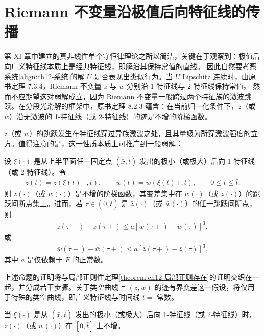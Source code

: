 \documentclass[../../main.tex]{subfiles}
\begin{document}
\section{Riemann 不变量沿极值后向特征线的传播}\label{section:ch12-传播}

第 XI 章中建立的真非线性单个守恒律理论之所以简洁，关键在于观察到：极值后向广义特征线本质上是经典特征线，即解沿其保持常值的直线。
因此自然要考察系统\eqref{align:ch12-系统}的解 $U$ 是否表现出类似行为。当 $U$ Lipschitz 连续时，由原书定理 7.3.4，Riemann 不变量 $z$ 与 $w$ 分别沿 1-特征线与 2-特征线保持常值。
然而不应期望这对弱解成立，因为 Riemann 不变量一般跨过两个特征族的激波跳跃。在分段光滑解的框架中，原书定理 8.2.3 蕴含：在当前归一化条件下，$z$（或 $w$）沿无激波的 1-特征线（或 2-特征线）的迹是不增的阶梯函数。

$z$（或 $w$）的跳跃发生在特征线穿过异族激波之处，且其量级为所穿激波强度的立方。值得注意的是，这一性质本质上可推广到一般弱解：

\begin{theorem}\label{theorem:ch12-传播主定理}
设 $\xi(\cdot)$ 是从上半平面任一固定点 $(\bar x,\bar t)$ 发出的极小（或极大）后向 1-特征线（或 2-特征线）。令
\begin{align}
\bar z(t)=z(\xi(t)-,t),\qquad \bar w(t)=w(\xi(t)+,t),\qquad 0\leqslant t\leqslant\bar t.
\label{align:ch12-迹定义}
\end{align}
则 $\bar z(\cdot)$（或 $\bar w(\cdot)$）是不增的阶梯函数，其变差集中在 $\bar w(\cdot)$（或 $\bar z(\cdot)$）的跳跃间断点集上。进而，若 $\tau\in(0,\bar t)$ 是 $\bar z(\cdot)$（或 $\bar w(\cdot)$）的任一跳跃间断点，则
\begin{align}
\bar z(\tau-)-\bar z(\tau+)\leqslant a[\bar w(\tau+)-\bar w(\tau)]^3,
\label{align:ch12-立方1}
\end{align}
或
\begin{align}
\bar w(\tau-)-\bar w(\tau+)\leqslant a[\bar z(\tau+)-\bar z(\tau)]^3,
\label{align:ch12-立方2}
\end{align}
其中 $a$ 是仅依赖于 $F$ 的正常数。
\end{theorem}

上述命题的证明将与局部正则性定理\cref{theorem:ch12-局部正则存在}的证明交织在一起，并分成若干步骤。关于类空曲线上 $(z,w)$ 的迹有界变差这一假设，将仅用于特殊的类空曲线，即广义特征线与时间线 $t=$ 常数。

\begin{lemma}\label{lemma:ch12-迹不增}
当 $\xi(\cdot)$ 是从 $(\bar x,\bar t)$ 发出的极小（或极大）后向 1-特征线（或 2-特征线）时，$\bar z(\cdot)$（或 $\bar w(\cdot)$）在 $[0,\bar t]$ 上不增。
\end{lemma}
\end{document}

